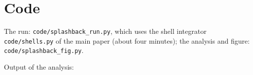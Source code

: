\documentclass[11pt,a4paper]{article}
\begin{document}
\appendix
\section{Code}
The run: \texttt{code/splashback\_run.py}, which uses the shell
integrator \texttt{code/shells.py} of the main paper (about four
minutes); the analysis and figure: \texttt{code/splashback\_fig.py}.


Output of the analysis:

\end{document}
